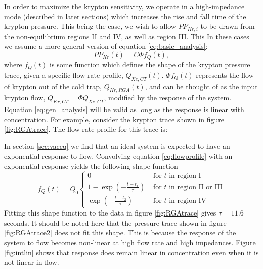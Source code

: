 In order to maximize the krypton sensitivity, we operate in a high-impedance mode (described in later sections) which increases the rise and fall time of the krypton pressure. This being the case, we wish to allow $PP_{Kr,i}$ to be drawn from the non-equilibrium regions II and IV, as well as region III. This In these cases we assume a more general version of equation \ref{eq:basic_analysis}:
\begin{equation}
\label{eq:gen_analysis}
PP_{Kr}(t)=C\Phi f_{Q}(t),
\end{equation}
where $f_{Q}(t)$ is some function which defines the shape of the krypton pressure trace, given a specific flow rate profile, $Q_{Xe,CT}(t)$. $\Phi f_{Q}(t)$ represents the flow of krypton out of the cold trap, $Q_{Kr,RGA}(t)$, and can be thought of as the input krypton flow, $Q_{Kr,CT}=\Phi Q_{Xe,CT}$, modified by the response of the system. Equation \ref{eq:gen_analysis} will be valid as long as the response is linear with concentration. For example, consider the krypton trace shown in figure \ref{fig:RGAtrace}. The flow rate profile for this trace is:

In section \ref{sec:vaceq} we find that an ideal system is expected to have an exponential response to flow. Convolving equation \ref{eq:flowprofile} with an exponential response yields the following shape function
\begin{equation}
\label{eq:shapefunc}
f_Q(t) = Q_0
  \begin{cases}
    0&\textrm{ for $t$ in region I}\\
    1-\exp(-\frac{t-t_1}{\tau})&\textrm{ for $t$ in region II or III}\\
    \exp(-\frac{t-t_2}{\tau})&\textrm{ for $t$ in region IV}
  \end{cases}
\end{equation}
Fitting this shape function to the data in figure \ref{fig:RGAtrace} gives $\tau = 11.6$ seconds. It should be noted here that the pressure trace shown in figure \ref{fig:RGAtrace2} does not fit this shape. This is because the response of the system to flow becomes non-linear at high flow rate and high impedances. Figure \ref{fig:intlin} shows that response does remain linear in concentration even when it is not linear in flow.

